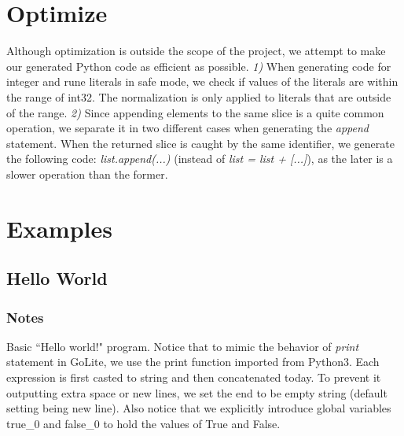 \documentclass{article}
\begin{document}

\section{Optimize}

Although optimization is outside the scope of the project, we attempt to
make our generated Python code as efficient as possible. \textit{1)} When
generating code for integer and rune literals in safe mode, we check if
values of the literals are within the range of int32. The normalization 
is only applied to literals that are outside of the range. \textit{2)}
Since appending elements to the same slice is a quite common operation,
we separate it in two different cases when generating the \textit{append}
statement. When the returned slice is caught by the same identifier, we
generate the following code: \textit{list.append(...)} (instead of
\textit{list = list + [...]}), as the later is a slower operation than 
the former.

\section{Examples}


\subsection{Hello World}
\subsubsection{Notes}
Basic ``Hello world!" program. Notice that to mimic the behavior of
\textit{print} statement in GoLite, we use the print function imported
from Python3. Each expression is first casted to string and then
concatenated today. To prevent it outputting extra space or new lines,
we set the end to be empty string (default setting being new line). Also
notice that we explicitly introduce global variables true\_0 and false\_0
to hold the values of True and False.
\end{document}
